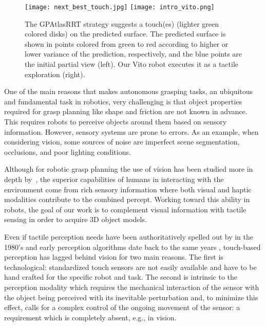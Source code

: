 \begin{figure}
\centering
  \texttt{[image: next\_best\_touch.jpg]}
  \texttt{[image: intro\_vito.png]}
\caption{The GPAtlasRRT strategy suggests a touch(es) (lighter green colored disks) on the predicted surface. The predicted surface is shown in points colored from green to red according to higher or lower variance of the prediction, respectively, and the blue points are the initial partial view (left). Our Vito robot executes it as a tactile exploration (right). }
\label{fig:setup_solution}
\end{figure}

One of the main reasons that makes autonomous grasping tasks, an ubiquitous and fundamental task in robotics, very challenging is that object properties required for grasp planning like shape and friction are not known %
in advance.
This requires robots to perceive objects around them based on sensory information. However, sensory systems are prone to errors. As an example, when considering vision, some sources of noise are imperfect scene segmentation, occlusions, and poor lighting conditions.

Although for robotic grasp planning the use of vision has been studied more in depth by~\cite{Kragic2002TechRep}, the superior capabilities of humans in interacting with the environment come from rich sensory information where both visual and haptic modalities contribute to the combined percept. Working toward this ability in robots, the goal of our work is to complement visual information with tactile sensing in order to acquire 3D object models.

Even if tactile perception needs have been authoritatively spelled out by \cite{Bajcsy1988Active} in the 1980's and early perception algorithms date back to the same years \citep{Grimson1984JRR,Faugeras1983IJCAI,Shekhar1986ICRA,Bajcsy1989Machine}, touch-based perception has lagged behind vision for two main reasons. The first is technological: standardized touch sensors are not easily available and have to be hand crafted for the specific robot and task. The second is intrinsic to the perception modality which requires the mechanical interaction of the sensor with the object being perceived with its inevitable perturbation and, to minimize this effect, calls for a complex control of the ongoing movement of the sensor: a requirement which is completely absent, e.g., in vision.

